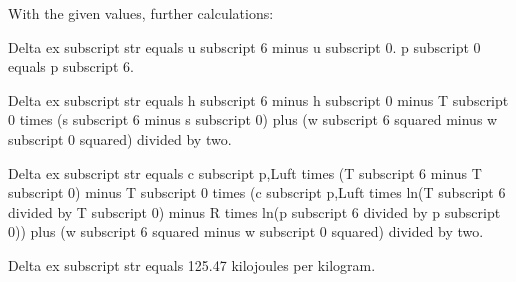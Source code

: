 With the given values, further calculations:  

Delta ex subscript str equals u subscript 6 minus u subscript 0.  
p subscript 0 equals p subscript 6.  

Delta ex subscript str equals h subscript 6 minus h subscript 0 minus T subscript 0 times (s subscript 6 minus s subscript 0) plus (w subscript 6 squared minus w subscript 0 squared) divided by two.  

Delta ex subscript str equals c subscript p,Luft times (T subscript 6 minus T subscript 0) minus T subscript 0 times (c subscript p,Luft times ln(T subscript 6 divided by T subscript 0) minus R times ln(p subscript 6 divided by p subscript 0)) plus (w subscript 6 squared minus w subscript 0 squared) divided by two.  

Delta ex subscript str equals 125.47 kilojoules per kilogram.